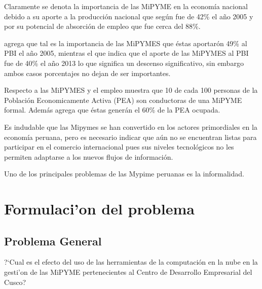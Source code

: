  Claramente se denota
la importancia de las MiPYME en la econom\'ia nacional debido a su aporte a la
producci\'on nacional que seg\'un \citep{arbulu} fue de 42\% el a\~no 2005 y por
su potencial de absorci\'on de empleo que fue cerca del 88\%.

\cite{arbulu} agrega que tal es la importancia de las MiPYMES que \'estas aportar\'on
49\% al PBI el a\~no 2005, mientras el que \citep{produce} indica que el aporte
de las MiPYMES al PBI fue de 40\% el a\~no 2013 lo que significa un descenso significativo,
sin embargo ambos casos porcentajes no dejan de ser importantes.

Respecto a las MiPYMES y el empleo \cite{produce2} muestra que 10 de cada 100 personas
de la Poblaci\'on Economicamente Activa (PEA) son conductoras de una MiPYME formal.
Adem\'as agrega que \'estas gener\'an el 60\% de la PEA ocupada.

Es indudable que las Mipymes se han convertido en los actores primordiales en la
econom\'ia peruana, pero es necesario indicar que a\'un no se encuentran listas
para participar en el comercio internacional pues sus niveles tecnol\'ogicos no
les permiten adaptarse a los nuevos flujos de informaci\'on.

Uno de los principales problemas de las Mypime peruanas es la informalidad.

\section{Formulaci'on del problema}
\subsection{Problema General}
?`Cual es el efecto del uso de las herramientas de la computaci\'on en la nube
en la gesti'on de las MiPYME pertenecientes al Centro de Desarrollo Empresarial
del Cusco?
